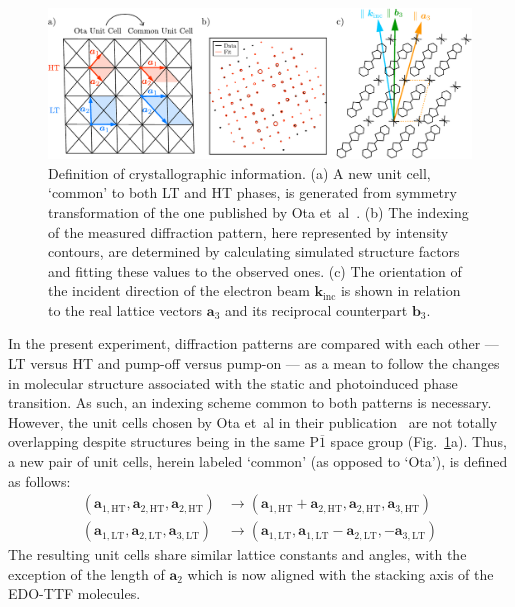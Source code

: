 \begin{figure}[ht!]
  \centering
  \includegraphics[width = \textwidth]{Figures/fig_EDO_unitcell_ori.pdf}
  \caption[Indexing of diffraction pattern and refinement of crystal orientation.]{
  Definition of crystallographic information.
  (a) A new unit cell, `common' to both LT and HT phases, is generated from symmetry transformation
  of the one published by Ota et~al~\cite{Ota2002}.
  (b) The indexing of the measured diffraction pattern, here represented by intensity contours,
  are determined by calculating simulated structure factors and fitting these values to the observed ones.
  (c) The orientation of the incident direction of the electron beam $\boldsymbol{k}_\text{inc}$
  is shown in relation to the real lattice vectors $\boldsymbol{a}_3$
  and its reciprocal counterpart $\boldsymbol{b}_3$.
  }
  \label{fig: EDO-unitcell-ori}
\end{figure}
%
In the present experiment, diffraction patterns are compared with each other
--- LT versus HT and pump-off versus pump-on --- as a mean to follow the changes in molecular structure
associated with the static and photoinduced phase transition.
%
As such, an indexing scheme common to both patterns is necessary.
%
However, the unit cells chosen by Ota et~al in their publication~\cite{Ota2002} are not totally overlapping
despite structures being in the same P$\overline{1}$ space group (Fig.~\ref{fig: EDO-unitcell-ori}a).
%
Thus, a new pair of unit cells, herein labeled `common' (as opposed to `Ota'), is defined as follows:
%
\begin{equation}
  \begin{aligned}
    (\boldsymbol{a}_{1, \text{HT}}, \boldsymbol{a}_{2, \text{HT}}, \boldsymbol{a}_{2, \text{HT}})
      & \rightarrow (\boldsymbol{a}_{1, \text{HT}} + \boldsymbol{a}_{2, \text{HT}},
        \boldsymbol{a}_{2, \text{HT}},
        \boldsymbol{a}_{3, \text{HT}}) \\
    (\boldsymbol{a}_{1, \text{LT}}, \boldsymbol{a}_{2, \text{LT}}, \boldsymbol{a}_{3, \text{LT}})
      & \rightarrow (\boldsymbol{a}_{1, \text{LT}},
        \boldsymbol{a}_{1, \text{LT}} - \boldsymbol{a}_{2, \text{LT}},
        - \boldsymbol{a}_{3, \text{LT}})
  \end{aligned}
\end{equation}
%
The resulting unit cells share similar lattice constants and angles,
with the exception of the length of $\boldsymbol{a}_2$
which is now aligned with the stacking axis of the EDO-TTF molecules.

